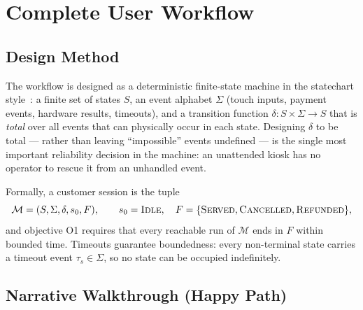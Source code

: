 \section{Complete User Workflow}
\label{sec:workflow}

\subsection{Design Method}

The workflow is designed as a deterministic finite-state machine in the
statechart style~\cite{harel1987statecharts}: a finite set of states $S$, an
event alphabet $\Sigma$ (touch inputs, payment events, hardware results,
timeouts), and a transition function $\delta : S \times \Sigma \rightarrow S$
that is \emph{total} over all events that can physically occur in each state.
Designing $\delta$ to be total --- rather than leaving ``impossible'' events
undefined --- is the single most important reliability decision in the
machine: an unattended kiosk has no operator to rescue it from an unhandled
event.

Formally, a customer session is the tuple
\begin{equation}
  \mathcal{M} = (S, \Sigma, \delta, s_0, F), \qquad
  s_0 = \textsc{Idle}, \quad
  F = \{\textsc{Served}, \textsc{Cancelled}, \textsc{Refunded}\},
  \label{eq:fsm}
\end{equation}
and objective O1 requires that every reachable run of $\mathcal{M}$ ends in
$F$ within bounded time. Timeouts guarantee boundedness: every non-terminal
state carries a timeout event $\tau_s \in \Sigma$, so no state can be
occupied indefinitely.

\subsection{Narrative Walkthrough (Happy Path)}
\label{sec:happypath}

